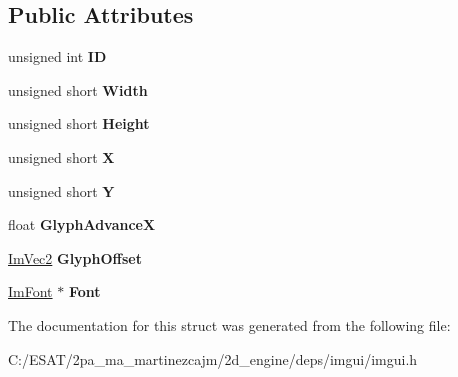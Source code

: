 \subsection*{Public Attributes}
\begin{DoxyCompactItemize}
\item 
\mbox{\label{struct_im_font_atlas_1_1_custom_rect_a1afc9c6d72105e6695fbefa08e086387}} 
unsigned int {\bfseries ID}
\item 
\mbox{\label{struct_im_font_atlas_1_1_custom_rect_a961e02b6cda1eb69dfd2f2d40ae40d5f}} 
unsigned short {\bfseries Width}
\item 
\mbox{\label{struct_im_font_atlas_1_1_custom_rect_a7b423a44d98a6f5695941300906418e5}} 
unsigned short {\bfseries Height}
\item 
\mbox{\label{struct_im_font_atlas_1_1_custom_rect_af080bc8663332dfd5576d9a6a5313089}} 
unsigned short {\bfseries X}
\item 
\mbox{\label{struct_im_font_atlas_1_1_custom_rect_ae1739c480b82fa11ebdd1edb9e3cf5eb}} 
unsigned short {\bfseries Y}
\item 
\mbox{\label{struct_im_font_atlas_1_1_custom_rect_afb55b310d9816386f2eb2f11df9f11e2}} 
float {\bfseries Glyph\+AdvanceX}
\item 
\mbox{\label{struct_im_font_atlas_1_1_custom_rect_a18a84c649c382fafe75eba628b5d599e}} 
\hyperlink{struct_im_vec2}{Im\+Vec2} {\bfseries Glyph\+Offset}
\item 
\mbox{\label{struct_im_font_atlas_1_1_custom_rect_aeffa65b37c8d9241e3720472a019aad2}} 
\hyperlink{struct_im_font}{Im\+Font} $\ast$ {\bfseries Font}
\end{DoxyCompactItemize}


The documentation for this struct was generated from the following file\+:\begin{DoxyCompactItemize}
\item 
C\+:/\+E\+S\+A\+T/2pa\+\_\+ma\+\_\+martinezcajm/2d\+\_\+engine/deps/imgui/imgui.\+h\end{DoxyCompactItemize}
